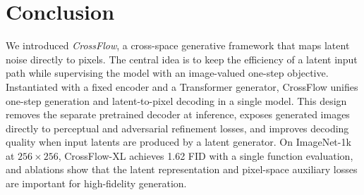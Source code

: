 \section{Conclusion}

We introduced \emph{CrossFlow}, a cross-space generative framework that maps latent noise directly to pixels. The central idea is to keep the efficiency of a latent input path while supervising the model with an image-valued one-step objective. Instantiated with a fixed encoder and a Transformer generator, CrossFlow unifies one-step generation and latent-to-pixel decoding in a single model. This design removes the separate pretrained decoder at inference, exposes generated images directly to perceptual and adversarial refinement losses, and improves decoding quality when input latents are produced by a latent generator. On ImageNet-1k at $256\times256$, CrossFlow-XL achieves 1.62 FID with a single function evaluation, and ablations show that the latent representation and pixel-space auxiliary losses are important for high-fidelity generation.
